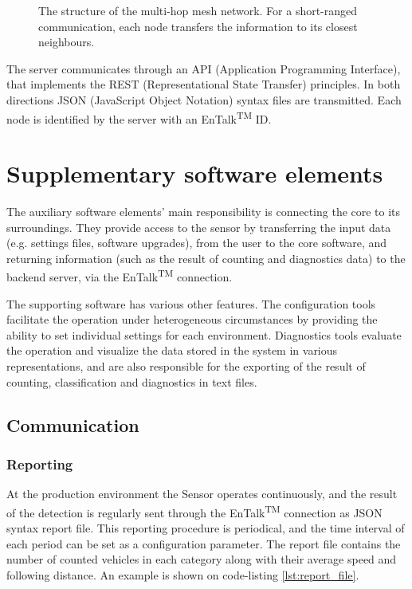 \begin{figure}[!h]
	\centering
	
	\caption{The structure of the multi-hop mesh network. For a short-ranged communication, each node transfers the information to its closest neighbours. \label{fig:network}}
\end{figure}

The server communicates through an API (Application Programming Interface), that implements the REST (Representational State Transfer) principles. 
In both directions JSON (JavaScript Object Notation) syntax files are transmitted.
Each node is identified by the server with an EnTalk\textsuperscript{TM} ID.
\section{Supplementary software elements}\label{sec:SupplementarySoftware}
The auxiliary software elements' main responsibility is connecting the core to its surroundings.
They provide access to the sensor by transferring the input data (e.g. settings files, software upgrades), from the user to the core software, and returning information (such as the result of counting and diagnostics data) to the backend server, via the EnTalk\textsuperscript{TM} connection.

The supporting software has various other features.
The configuration tools facilitate the operation under heterogeneous circumstances by providing the ability to set individual settings for each environment.
Diagnostics tools evaluate the operation and visualize the data stored in the system in various representations, and are also responsible for the exporting of the result of counting, classification and diagnostics in text files.
\subsection{Communication}
\subsubsection{Reporting}
At the production environment the Sensor operates continuously, and the result of the detection is regularly sent through the EnTalk\textsuperscript{TM} connection as JSON syntax report file. 
This reporting procedure is periodical, and the time interval of each period can be set as a configuration parameter.
The report file contains the number of counted vehicles in each category along with their average speed and following distance.
An example is shown on code-listing \ref{lst:report_file}.

